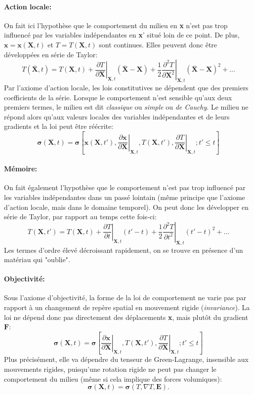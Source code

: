 \paragraph{Action locale: } On fait ici l'hypothèse que le comportement du milieu en \textbf{x} n'est pas trop influencé par les variables indépendantes en \textbf{x}' situé loin de ce point. De plus, $\textbf{x}=\textbf{x}(\textbf{X},t)$ et $T=T(\textbf{X},t)$ sont continues. Elles peuvent donc être développées en série de Taylor:
$$T(\bar{\textbf{X}},t)=T(\textbf{X},t)+\left.\frac{\partial T}{\partial \textbf{X}}\right|_{\textbf{X},t}(\bar{\textbf{X}}-\textbf{X})+\frac{1}{2}\left.\frac{\partial^2T}{\partial\textbf{X}^2}\right|_{\textbf{X},t}(\bar{\textbf{X}}-\textbf{X})^2+...$$ Par l'axiome d'action locale, les lois constitutives ne dépendent que des premiers coefficients de la série. Lorsque le comportement n'est sensible qu'aux deux premiers termes, le milieu est dit \emph{classique} ou \emph{simple} ou \emph{de Cauchy}. Le milieu ne répond alors qu'aux valeurs locales des variables indépendantes et de leurs gradients et la loi peut être réécrite:
$$\boldsymbol{\sigma}(\textbf{X},t)=\boldsymbol{\sigma}\left[\textbf{x}(\textbf{X},t'),\left.\frac{\partial \textbf{x}}{\partial\textbf{X}}\right|_{\textbf{X},t},T(\textbf{X},t'),\left.\frac{\partial T}{\partial \textbf{X}}\right|_{\textbf{X},t}; t'\leq t\right]$$
\paragraph{Mémoire: } On fait également l'hypothèse que le comportement n'est pas trop influencé par les variables indépendantes dans un passé lointain (même principe que l'axiome d'action locale, mais dans le domaine temporel). On peut donc les développer en série de Taylor, par rapport au temps cette fois-ci:
$$T(\textbf{X},t')=T(\textbf{X},t)+\left.\frac{\partial T}{\partial t}\right|_{\textbf{X},t}(t'-t)+\frac{1}{2}\left.\frac{\partial^2T}{\partial t^2}\right|_{\textbf{X},t}(t'-t)^2+...$$ Les termes d'ordre élevé décroissant rapidement, on se trouve en présence d'un matériau qui "oublie". 
\paragraph{Objectivité: } Sous l'axiome d'objectivité, la forme de la loi de comportement ne varie pas par rapport à un changement de repère spatial en mouvement rigide (\emph{invariance}). La loi ne dépend donc pas directement des déplacements \textbf{x}, mais plutôt du gradient $\textbf{F}$:
$$\boldsymbol{\sigma}(\textbf{X},t)=\boldsymbol{\sigma}\left[\left.\frac{\partial \textbf{x}}{\partial\textbf{X}}\right|_{\textbf{X},t},T(\textbf{X},t'),\left.\frac{\partial T}{\partial \textbf{X}}\right|_{\textbf{X},t}; t'\leq t\right]$$ Plus précisément, elle va dépendre du tenseur de Green-Lagrange, insensible aux mouvements rigides, puisqu'une rotation rigide ne peut pas changer le comportement du milieu (même si cela implique des forces volumiques): $$\boldsymbol{\sigma}(\textbf{X},t)=\boldsymbol{\sigma}(T,\nabla T, \textbf{E}).$$
